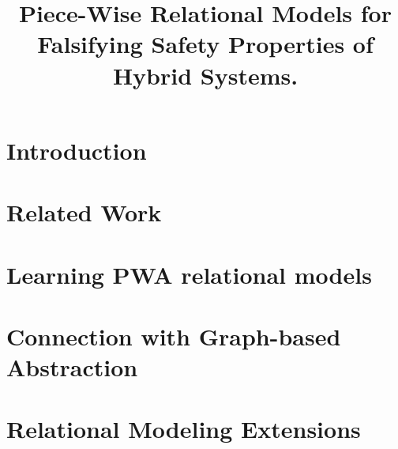 \documentclass{sig-alternate}
\begin{document}



\title{Piece-Wise Relational Models for \\ Falsifying Safety
Properties of Hybrid Systems.
}





\maketitle

\begin{abstract}
  
\end{abstract}


\section{Introduction}
\label{sec:intro}



\section{Related Work}
\label{sec:rel}


\section{Learning PWA relational models}
\label{sec:prelims}


\section{Connection with Graph-based Abstraction}
\label{sec:pwa-rel}


\section{Relational Modeling Extensions}
\label{sec:rel-mod}

\end{document}
